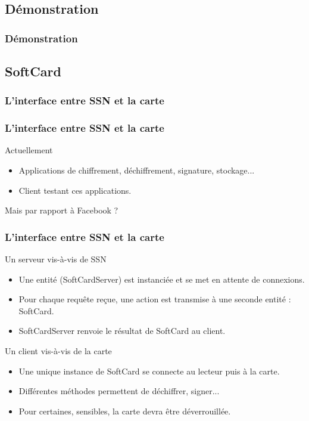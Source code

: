 \documentclass{beamer}
\begin{document}
\subsection{Démonstration}
\begin{frame}
    \frametitle{Démonstration}
    \begin{block}{}
    \end{block}
\end{frame}

\subsection{SoftCard}
\begin{frame}
\frametitle{L'interface entre SSN et la carte}
    \frametitle{L'interface entre SSN et la carte}
    \begin{block}{Actuellement}
        \begin{itemize}
            \item Applications de chiffrement, déchiffrement, signature, stockage...
            \item Client testant ces applications.
        \end{itemize}
    \end{block}

    Mais par rapport à Facebook ?
\end{frame}

\begin{frame}
    \frametitle{L'interface entre SSN et la carte}
    \begin{block}{Un serveur vis-à-vis de SSN}
        \begin{itemize}
            \item Une entité (SoftCardServer) est instanciée et se met en
                attente de connexions.
            \item Pour chaque requête reçue, une action est transmise
                à une seconde entité : SoftCard.
            \item SoftCardServer renvoie le résultat de SoftCard au client.
        \end{itemize}
    \end{block}
    \begin{block}{Un client vis-à-vis de la carte}
        \begin{itemize}
            \item Une unique instance de SoftCard se connecte au lecteur puis à
                la carte.
            \item Différentes méthodes permettent de déchiffrer, signer...
            \item Pour certaines, sensibles, la carte devra être déverrouillée.
        \end{itemize}
    \end{block}
\end{frame}
\end{document}
